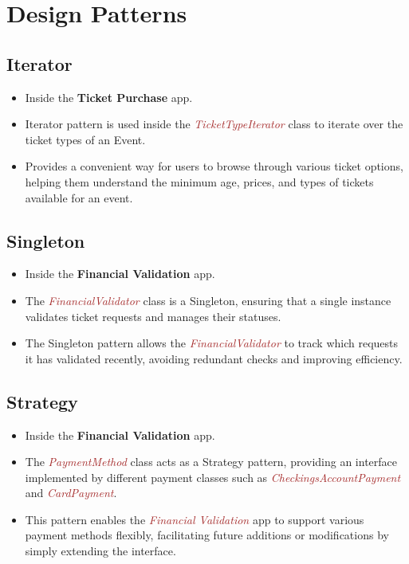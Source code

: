 \documentclass{article}
\newcommand{\designclass}[1]{\textit{\textcolor{brown}{#1}}}
\newcommand{\application}[1]{\textbf{\textcolor{codegreen}{#1}}}
\begin{document}
\FloatBarrier
\section{Design Patterns}
\FloatBarrier
\subsection{Iterator}
\begin{itemize}
    \item Inside the \application{Ticket Purchase} app.
    \item Iterator pattern is used inside the \designclass{TicketTypeIterator} class to iterate over the ticket types of an Event.
    \item Provides a convenient way for users to browse through various ticket options, helping them understand the minimum age, prices, and types of tickets available for an event.
\end{itemize}

\FloatBarrier
\subsection{Singleton}
\begin{itemize}
\item Inside the \application{Financial Validation} app.
\item The \designclass{FinancialValidator} class is a Singleton, ensuring that a single instance validates ticket requests and manages their statuses.
\item The Singleton pattern allows the \designclass{FinancialValidator} to track which requests it has validated recently, avoiding redundant checks and improving efficiency.
\end{itemize}

\FloatBarrier
\subsection{Strategy}
\begin{itemize}
\item Inside the \application{Financial Validation} app.
\item The \designclass{PaymentMethod} class acts as a Strategy pattern, providing an interface implemented by different payment classes such as \designclass{CheckingsAccountPayment} and \designclass{CardPayment}.
\item This pattern enables the \designclass{Financial Validation} app to support various payment methods flexibly, facilitating future additions or modifications by simply extending the interface.
\end{itemize}
\end{document}
